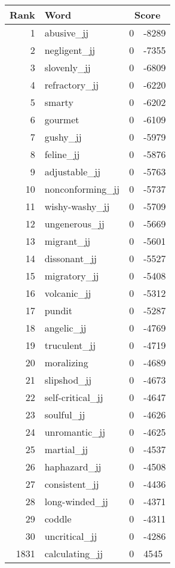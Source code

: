 \begin{longtable}[!htbp]{| rlr@{.}l |}
    \hline
    \textbf{Rank} & \textbf{Word} & \multicolumn{2}{c|}{\textbf{Score}} \\
    \hline
    \endhead
    1 & abusive\_jj & 0 & -8289 \\
    2 & negligent\_jj & 0 & -7355 \\
    3 & slovenly\_jj & 0 & -6809 \\
    4 & refractory\_jj & 0 & -6220 \\
    5 & smarty & 0 & -6202 \\
    6 & gourmet & 0 & -6109 \\
    7 & gushy\_jj & 0 & -5979 \\
    8 & feline\_jj & 0 & -5876 \\
    9 & adjustable\_jj & 0 & -5763 \\
    10 & nonconforming\_jj & 0 & -5737 \\
    11 & wishy-washy\_jj & 0 & -5709 \\
    12 & ungenerous\_jj & 0 & -5669 \\
    13 & migrant\_jj & 0 & -5601 \\
    14 & dissonant\_jj & 0 & -5527 \\
    15 & migratory\_jj & 0 & -5408 \\
    16 & volcanic\_jj & 0 & -5312 \\
    17 & pundit & 0 & -5287 \\
    18 & angelic\_jj & 0 & -4769 \\
    19 & truculent\_jj & 0 & -4719 \\
    20 & moralizing & 0 & -4689 \\
    21 & slipshod\_jj & 0 & -4673 \\
    22 & self-critical\_jj & 0 & -4647 \\
    23 & soulful\_jj & 0 & -4626 \\
    24 & unromantic\_jj & 0 & -4625 \\
    25 & martial\_jj & 0 & -4537 \\
    26 & haphazard\_jj & 0 & -4508 \\
    27 & consistent\_jj & 0 & -4436 \\
    28 & long-winded\_jj & 0 & -4371 \\
    29 & coddle & 0 & -4311 \\
    30 & uncritical\_jj & 0 & -4286 \\
    1831 & calculating\_jj & 0 & 4545 \\

\end{longtable}
